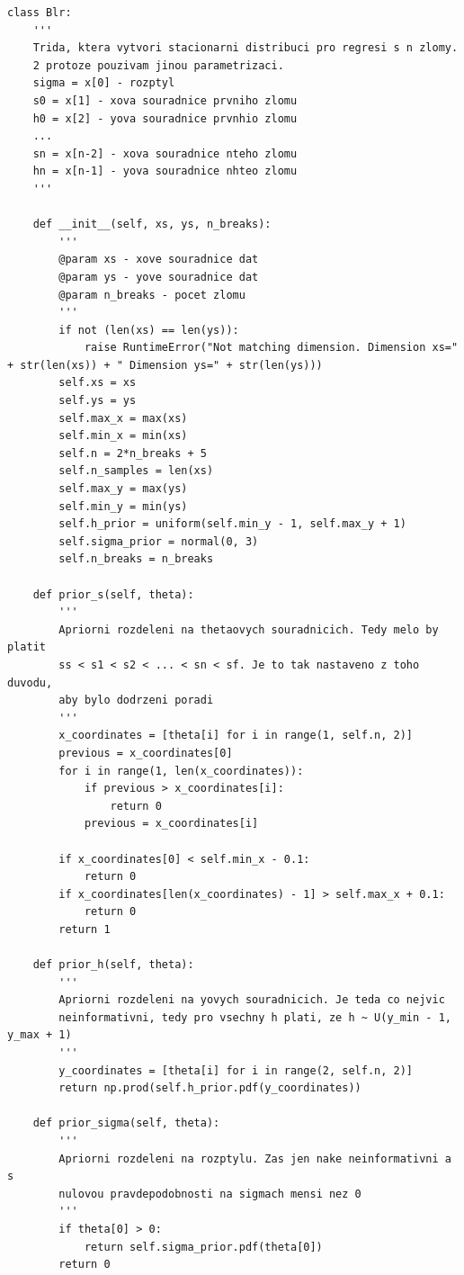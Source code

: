 \documentclass[czech,master,public,dept470,male,cpdeclaration,oneside, python]{diploma}
\begin{document}
\begin{lstlisting}[label=blr, caption=Blr]
class Blr:
    '''
    Trida, ktera vytvori stacionarni distribuci pro regresi s n zlomy.
    2 protoze pouzivam jinou parametrizaci.
    sigma = x[0] - rozptyl 
    s0 = x[1] - xova souradnice prvniho zlomu
    h0 = x[2] - yova souradnice prvnhio zlomu
    ...
    sn = x[n-2] - xova souradnice nteho zlomu
    hn = x[n-1] - yova souradnice nhteo zlomu
    '''

    def __init__(self, xs, ys, n_breaks):
        '''
        @param xs - xove souradnice dat
        @param ys - yove souradnice dat
        @param n_breaks - pocet zlomu
        '''
        if not (len(xs) == len(ys)):
            raise RuntimeError("Not matching dimension. Dimension xs=" + str(len(xs)) + " Dimension ys=" + str(len(ys)))
        self.xs = xs
        self.ys = ys
        self.max_x = max(xs)
        self.min_x = min(xs)
        self.n = 2*n_breaks + 5
        self.n_samples = len(xs)
        self.max_y = max(ys)
        self.min_y = min(ys)
        self.h_prior = uniform(self.min_y - 1, self.max_y + 1)
        self.sigma_prior = normal(0, 3)
        self.n_breaks = n_breaks
        
    def prior_s(self, theta):
        '''
        Apriorni rozdeleni na thetaovych souradnicich. Tedy melo by platit
        ss < s1 < s2 < ... < sn < sf. Je to tak nastaveno z toho duvodu,
        aby bylo dodrzeni poradi
        '''
        x_coordinates = [theta[i] for i in range(1, self.n, 2)]
        previous = x_coordinates[0]
        for i in range(1, len(x_coordinates)):
            if previous > x_coordinates[i]:
                return 0
            previous = x_coordinates[i]

        if x_coordinates[0] < self.min_x - 0.1:
            return 0
        if x_coordinates[len(x_coordinates) - 1] > self.max_x + 0.1:
            return 0
        return 1

    def prior_h(self, theta):
        '''
        Apriorni rozdeleni na yovych souradnicich. Je teda co nejvic
        neinformativni, tedy pro vsechny h plati, ze h ~ U(y_min - 1, y_max + 1)
        '''
        y_coordinates = [theta[i] for i in range(2, self.n, 2)]
        return np.prod(self.h_prior.pdf(y_coordinates))

    def prior_sigma(self, theta):
        '''
        Apriorni rozdeleni na rozptylu. Zas jen nake neinformativni a s
        nulovou pravdepodobnosti na sigmach mensi nez 0
        '''
        if theta[0] > 0:
            return self.sigma_prior.pdf(theta[0])
        return 0


\end{lstlisting}
\end{document}
